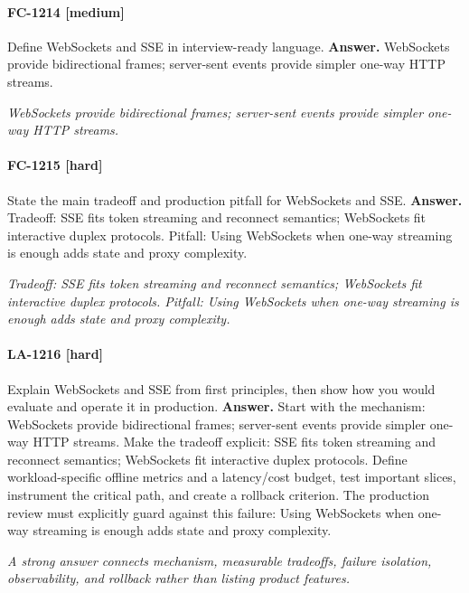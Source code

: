 \paragraph{FC-1214 [medium]} Define WebSockets and SSE in interview-ready language.
\noindent\textbf{Answer.} WebSockets provide bidirectional frames; server-sent events provide simpler one-way HTTP streams.
\par\textit{WebSockets provide bidirectional frames; server-sent events provide simpler one-way HTTP streams.}
\paragraph{FC-1215 [hard]} State the main tradeoff and production pitfall for WebSockets and SSE.
\noindent\textbf{Answer.} Tradeoff: SSE fits token streaming and reconnect semantics; WebSockets fit interactive duplex protocols. Pitfall: Using WebSockets when one-way streaming is enough adds state and proxy complexity.
\par\textit{Tradeoff: SSE fits token streaming and reconnect semantics; WebSockets fit interactive duplex protocols. Pitfall: Using WebSockets when one-way streaming is enough adds state and proxy complexity.}
\paragraph{LA-1216 [hard]} Explain WebSockets and SSE from first principles, then show how you would evaluate and operate it in production.
\noindent\textbf{Answer.} Start with the mechanism: WebSockets provide bidirectional frames; server-sent events provide simpler one-way HTTP streams. Make the tradeoff explicit: SSE fits token streaming and reconnect semantics; WebSockets fit interactive duplex protocols. Define workload-specific offline metrics and a latency/cost budget, test important slices, instrument the critical path, and create a rollback criterion. The production review must explicitly guard against this failure: Using WebSockets when one-way streaming is enough adds state and proxy complexity.
\par\textit{A strong answer connects mechanism, measurable tradeoffs, failure isolation, observability, and rollback rather than listing product features.}
